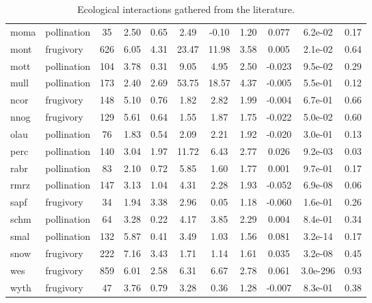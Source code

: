 \begin{table}[]
{\begin{tabular}{@{}llccccccccc@{}}
moma \cite{moma} & pollination & 35 & 2.50 & 0.65 & 2.49 & -0.10 & 1.20 & 0.077 & 6.2e-02 & 0.17 \\
mont \cite{mont} & frugivory & 626 & 6.05 & 4.31 & 23.47 & 11.98 & 3.58 & 0.005 & 2.1e-02 & 0.64 \\
mott \cite{mott} & pollination & 104 & 3.78 & 0.31 & 9.05 & 4.95 & 2.50 & -0.023 & 9.5e-02 & 0.29 \\
mull \cite{mull} & pollination & 173 & 2.40 & 2.69 & 53.75 & 18.57 & 4.37 & -0.005 & 5.5e-01 & 0.12 \\
ncor \cite{ncor} & frugivory & 148 & 5.10 & 0.76 & 1.82 & 2.82 & 1.99 & -0.004 & 6.7e-01 & 0.66 \\
nnog \cite{nnog} & frugivory & 129 & 5.61 & 0.64 & 1.55 & 1.87 & 1.75 & -0.022 & 5.0e-02 & 0.60 \\
olau \cite{olau} & pollination & 76 & 1.83 & 0.54 & 2.09 & 2.21 & 1.92 & -0.020 & 3.0e-01 & 0.13 \\
perc \cite{perc} & pollination & 140 & 3.04 & 1.97 & 11.72 & 6.43 & 2.77 & 0.026 & 9.2e-03 & 0.03 \\
rabr \cite{rabr} & pollination & 83 & 2.10 & 0.72 & 5.85 & 1.60 & 1.77 & 0.001 & 9.7e-01 & 0.17 \\
rmrz \cite{rmrz} & pollination & 147 & 3.13 & 1.04 & 4.31 & 2.28 & 1.93 & -0.052 & 6.9e-08 & 0.06 \\
sapf \cite{sapf} & frugivory & 34 & 1.94 & 3.38 & 2.96 & 0.05 & 1.18 & -0.060 & 1.6e-01 & 0.26 \\
schm \cite{schm} & pollination & 64 & 3.28 & 0.22 & 4.17 & 3.85 & 2.29 & 0.004 & 8.4e-01 & 0.34 \\
smal \cite{smal} & pollination & 132 & 5.87 & 0.41 & 3.49 & 1.03 & 1.56 & 0.081 & 3.2e-14 & 0.17 \\
snow \cite{snow} & frugivory & 222 & 7.16 & 3.43 & 1.71 & 1.14 & 1.61 & 0.035 & 3.2e-08 & 0.45 \\
wes  \cite{wes}  & frugivory & 859 & 6.01 & 2.58 & 6.31 & 6.67 & 2.78 & 0.061 & 3.0e-296 & 0.93 \\
wyth \cite{wyth} & frugivory & 47 & 3.76 & 0.79 & 3.28 & 0.36 & 1.28 & -0.007 & 8.3e-01 & 0.38 \\ \bottomrule
\end{tabular}%
}
\caption{Ecological interactions gathered from the literature.}
\label{FP_studies_table}
\end{table}
